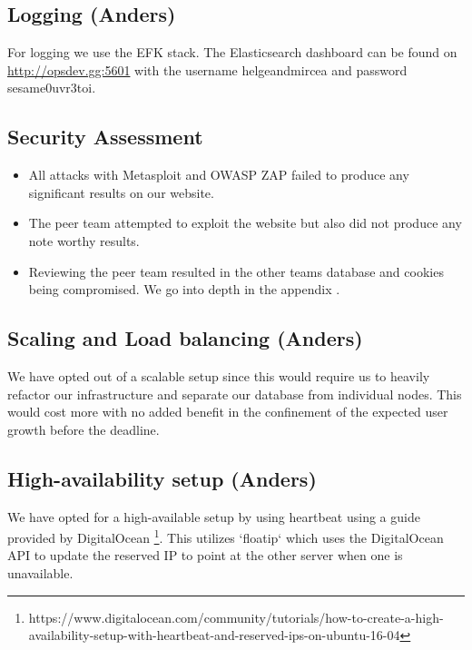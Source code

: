 \documentclass{article}
\begin{document}
\subsection{Logging (Anders)}

For logging we use the EFK stack. The Elasticsearch dashboard can be found on \url{http://opsdev.gg:5601} with the username helgeandmircea and password sesame0uvr3toi.

\subsection{Security Assessment}

\begin{itemize}
    \item All attacks with Metasploit and OWASP ZAP failed to produce any significant results on our website. 
    \item The peer team  attempted to exploit the website but also did not produce any note worthy results. 
    \item Reviewing the peer team resulted in the other teams database and cookies being compromised. We go into depth in the appendix \label{appendix:security assessment}.

\end{itemize}


 

\subsection{Scaling and Load balancing (Anders)}

We have opted out of a scalable setup since this would require us to heavily refactor our infrastructure and separate our database from individual nodes. This would cost more with no added benefit in the confinement of the expected user growth before the deadline.  

\subsection{High-availability setup (Anders)}

We have opted for a high-available setup by using heartbeat using a guide provided by DigitalOcean \footnote{https://www.digitalocean.com/community/tutorials/how-to-create-a-high-availability-setup-with-heartbeat-and-reserved-ips-on-ubuntu-16-04}. This utilizes `floatip` which uses the DigitalOcean API to update the reserved IP to point at the other server when one is unavailable. 
\end{document}
